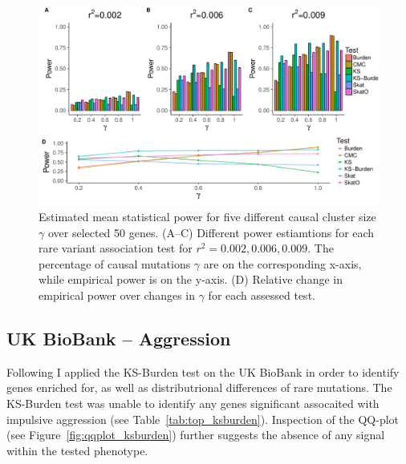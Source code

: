 \begin{figure}[ht!]
  \centering
  \includegraphics[width=1.0\linewidth]{ksburden/figures/combined_power_analysis.pdf}
  \caption{Estimated mean statistical power for five different causal cluster size $\gamma$ over selected 50 genes.
    (A--C) Different power estiamtions for each rare variant association test for $r^2=0.002, 0.006, 0.009$.
    The percentage of causal mutations $\gamma$ are on the corresponding x-axis, while empirical power is on the y-axis.
    (D) Relative change in empirical power over changes in $\gamma$ for each assessed test.\label{fig:simulatedGeneRealData}}
\end{figure}


\subsection{UK BioBank -- Aggression}
\label{sub:ukbiobank_aggression}

Following I applied the KS-Burden test on the UK BioBank in order to identify genes enriched for, as well as distributrional differences of rare mutations. 
The KS-Burden test was unable to identify any genes significant assocaited with impulsive aggression (see Table~\ref{tab:top_ksburden}).
Inspection of the QQ-plot (see Figure~\ref{fig:qqplot_ksburden}) further suggests the absence of any signal within the tested phenotype.

